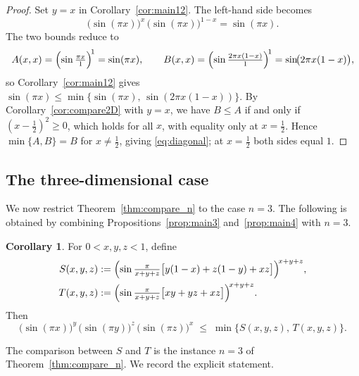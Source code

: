 \documentclass[12pt]{amsart}
\theoremstyle{definition}
\newtheorem{corollary}{Corollary}[section]
\begin{document}
\begin{proof}
Set $y=x$ in Corollary~\ref{cor:main12}.  The left-hand side becomes
\[
  \bigl(\sin(\pi x)\bigr)^x\,\bigl(\sin(\pi x)\bigr)^{1-x}
  = \sin(\pi x).
\]
The two bounds reduce to
\[
  A(x,x) = \Bigl(\sin\tfrac{\pi x}{1}\Bigr)^{\!1} = \sin(\pi x),
  \qquad
  B(x,x) = \Bigl(\sin\tfrac{2\pi x(1-x)}{1}\Bigr)^{\!1}
           = \sin\!\bigl(2\pi x(1-x)\bigr),
\]
so Corollary~\ref{cor:main12} gives
$\sin(\pi x)\leq\min\{\sin(\pi x),\,\sin(2\pi x(1-x))\}$.
By Corollary~\ref{cor:compare2D} with $y=x$, we have $B\leq A$ if and only if
$(x-\tfrac12)^2\geq 0$, which holds for all $x$, with equality only
at $x=\tfrac12$.  Hence $\min\{A,B\}=B$ for $x\neq\tfrac12$, giving
\eqref{eq:diagonal}; at $x=\tfrac12$ both sides equal $1$.

\end{proof}

\subsection{The three-dimensional case}\label{sec:3D}

We now restrict Theorem~\ref{thm:compare_n} to the case $n=3$.
The following is obtained by combining
Propositions~\ref{prop:main3} and~\ref{prop:main4} with $n=3$.

\begin{corollary}\label{cor:main34}
For $0<x,y,z<1$, define
\begin{align*}
  S(x,y,z)
  &:=\Bigl(\sin\tfrac\pi{x+y+z}\bigl[y(1-x)+z(1-y)+xz\bigr]
    \Bigr)^{\!x+y+z},\\
  T(x,y,z)
  &:=\Bigl(\sin\tfrac\pi{x+y+z}\bigl[xy+yz+xz\bigr]
    \Bigr)^{\!x+y+z}.
\end{align*}
Then
\begin{equation}\label{eq:main34}
  \bigl(\sin(\pi x)\bigr)^y\,
  \bigl(\sin(\pi y)\bigr)^z\,
  \bigl(\sin(\pi z)\bigr)^x
  \;\leq\;\min\{S(x,y,z),\,T(x,y,z)\}.
\end{equation}
\end{corollary}

The comparison between $S$ and $T$ is the instance $n=3$ of
Theorem~\ref{thm:compare_n}.  We record the explicit statement.
\end{document}
